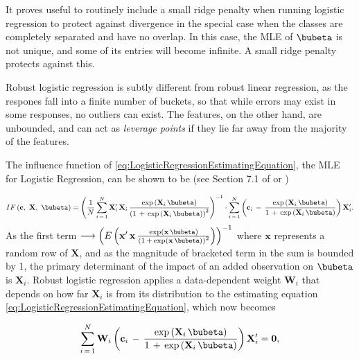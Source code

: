 \documentclass[graybox,envcountchap,sectrefs]{svmono}\usepackage[]{graphicx}\usepackage[]{xcolor}
\begin{document}
\begin{appendices}
It proves useful to routinely include a small ridge penalty when running
logistic regression to protect against divergence in the special case
when the classes are completely separated and have no overlap. In
this case, the MLE of $\bubeta$ is not unique, and some of its entries
will become infinite. A small ridge penalty protects against this.

Robust logistic regression is subtly different from robust linear
regression, as the respones fall into a finite number of buckets,
so that while errors may exist in some responses, no outliers can
exist. The features, on the other hand, are unbounded, and can act
as \emph{leverage points} if they lie far away from the majority of
the features.

The influence function of \eqref{eq:LogisticRegressionEstimatingEquation},
the MLE for Logistic Regression, can be shown to be (see Section 7.1
of \citet{Maronna2019} or \citet{Jann2020})

\begin{equation}
IF\left(\mathbf{c},\ \mathbf{X},\ \bubeta\right)=\left(\frac{1}{N}\sum_{i\,=\,1}^{N}\mathbf{X}_{i}^{\prime}\,\mathbf{X}_{i}\,\frac{\exp\left(\mathbf{X}_{i}\,\bubeta\right)}{\left(1\,+\,\exp\left(\mathbf{X}_{i}\,\bubeta\right)\right)^{2}}\right)^{-1}\cdot\sum_{i\,=\,1}^{N}\left(\mathbf{c}_{i}\,-\,\frac{\exp\left(\mathbf{X}_{i}\,\bubeta\right)}{1\,+\,\exp\left(\mathbf{X}_{i}\,\bubeta\right)}\right)\mathbf{X}_{i}^{\prime}.\label{eq:LogisticRegressionIF}
\end{equation}
As the first term $\longrightarrow\left(E\left(\mathbf{x^{\prime}}\,\mathbf{x}\,\frac{\exp\left(\mathbf{x}\,\bubeta\right)}{\left(1\,+\,\exp\left(\mathbf{x}\,\bubeta\right)\right)^{2}}\right)\right)^{-1}$
where $\mathbf{x}$ represents a random row of $\mathbf{X}$, and
as the magnitude of bracketed term in the sum is bounded by 1, the
primary determinant of the impact of an added observation on $\bubeta$
is $\mathbf{X}_{i}$. Robust logistic regression applies a data-dependent
weight $\mathbf{W}_{i}$ that depends on how far $\mathbf{X}_{i}$
is from its distribution to the estimating equation \eqref{eq:LogisticRegressionEstimatingEquation},
which now becomes 

\begin{equation}
\sum_{i\,=\,1}^{N}\mathbf{W}_{i}\left(\mathbf{c}_{i}\,-\,\frac{\exp\left(\mathbf{X}_{i}\,\bubeta\right)}{1\,+\,\exp\left(\mathbf{X}_{i}\,\bubeta\right)}\right)\mathbf{X}_{i}^{\prime}=\mathbf{0},\label{eq:RobustLogisticRegressionMLE}
\end{equation}


\end{appendices}
\end{document}
